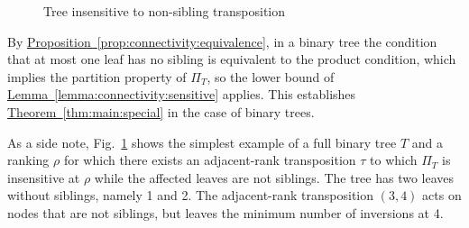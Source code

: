 \documentclass[11pt]{article}
\numberwithin{equation}{section}
\theoremstyle{definition}
\theoremstyle{plain}
\newcommand{\expref}[2]{\hyperref[#2]{#1~\ref{#2}}}
\newcommand{\ranking}{\rho}
\newcommand{\transposition}{\tau}
\begin{document}
%
\begin{figure}[ht]
%
    \centering
    \caption{Tree insensitive to non-sibling transposition}
    \label{fig:connectivity:insensitive-binary}
\end{figure}
%

By \expref{Proposition}{prop:connectivity:equivalence}, in a binary tree the condition that at most one leaf has no sibling is equivalent to the product condition, which implies the partition property of $\Pi_T$, so the lower bound of \expref{Lemma}{lemma:connectivity:sensitive} applies. This establishes \expref{Theorem}{thm:main:special} in the case of binary trees. 

As a side note, Fig.~\ref{fig:connectivity:insensitive-binary} shows the simplest example of a full binary tree $T$ and a ranking $\ranking$ for which there exists an adjacent-rank transposition $\transposition$ to which $\Pi_T$ is insensitive at $\ranking$ while the affected leaves are not siblings. The tree has two leaves without siblings, namely 1 and 2. The adjacent-rank transposition $(3,4)$ acts on nodes that are not siblings, but leaves the minimum number of inversions at 4.
\end{document}

